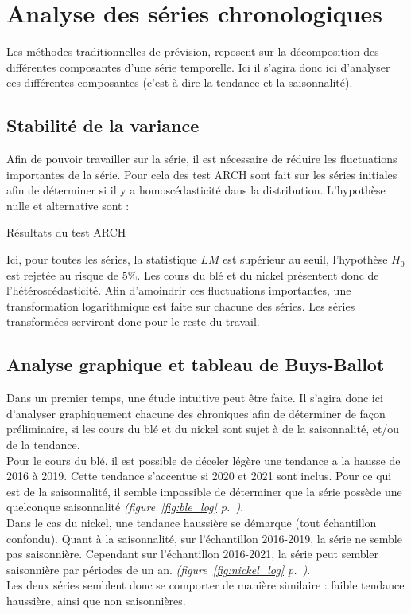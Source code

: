 \section{Analyse des séries chronologiques}
Les méthodes traditionnelles de prévision, reposent sur la décomposition des différentes composantes d'une série temporelle. Ici il s'agira donc
ici d'analyser ces différentes composantes (c'est à dire la tendance et la saisonnalité).
\subsection{Stabilité de la variance}
Afin de pouvoir travailler sur la série, il est nécessaire de réduire les 
fluctuations importantes de la série. Pour cela des test ARCH sont fait sur les 
séries initiales afin de déterminer si il y a homoscédasticité dans la distribution. L'hypothèse nulle et alternative sont :
\begin{table}[H]
    \centering
    \caption{Résultats du test ARCH}
    \sffamily
    
\end{table}
Ici, pour toutes les séries, la statistique $LM$ est supérieur au seuil, l'hypothèse $H_{0}$ est  rejetée au risque de $5\%$. Les cours du blé et du nickel
présentent donc de l'hétéroscédasticité. Afin d'amoindrir ces fluctuations importantes, une transformation logarithmique est faite sur chacune des séries. Les séries 
transformées serviront donc pour le reste du travail.
\subsection{Analyse graphique et tableau de Buys-Ballot}\label{graph}
Dans un premier temps, une étude intuitive peut être faite. Il s'agira donc ici d'analyser graphiquement chacune des chroniques afin 
de déterminer de façon préliminaire, si les cours du blé et du nickel sont sujet à de la saisonnalité, et/ou de la tendance.\\[11pt]
Pour le cours du blé, il est possible de déceler légère une tendance a la hausse de 2016 à 2019. Cette tendance s'accentue si 2020 et 2021 
sont inclus. Pour ce qui est de la saisonnalité, il semble impossible de déterminer que la série possède une quelconque saisonnalité
\textit{(figure~\ref{fig:ble_log} p.~\pageref{fig:ble_log})}.\\[11pt]
Dans le cas du nickel, une tendance haussière se démarque (tout échantillon confondu). Quant à la saisonnalité, sur l'échantillon 2016-2019, 
la série ne semble pas saisonnière. Cependant sur l'échantillon 2016-2021, la série peut sembler saisonnière par périodes de un an.
\textit{(figure~\ref{fig:nickel_log} p.~\pageref{fig:nickel_log})}.\\[11pt]
Les deux séries semblent donc se comporter de manière similaire : faible tendance haussière, ainsi que non saisonnières. 
